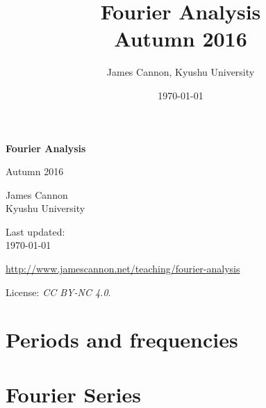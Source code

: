 \documentclass[a4paper]{book} %
\title{Fourier Analysis\\Autumn 2016}
\author{James Cannon, Kyushu University}
\date{\today}
\newcommand{\courseurl}{fourier-analysis}
\begin{document}
\begin{titlepage}
    \begin{center}
        \vspace*{1cm}
        
        \Huge
        \textbf{Fourier Analysis}

        Autumn 2016
        
        \vspace{2.0cm}
        \LARGE
        James Cannon\\Kyushu University
        
        \vspace{1.5cm}
        \Large
        Last updated:\\\today

        \vfill
        
        \normalsize
        \url{http://www.jamescannon.net/teaching/\courseurl}
        \vspace{0.5cm}

        \small
        License: \emph{CC BY-NC 4.0}.
        
    \end{center}
\end{titlepage}




\newpage
\tableofcontents

\chapter{Periods and frequencies}

\chapter{Fourier Series}


\end{document}
